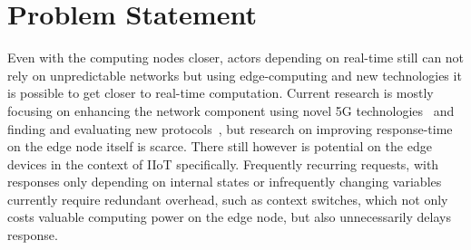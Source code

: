 \section{Problem Statement}

Even with the computing nodes closer, actors depending on real-time still can
not rely on unpredictable networks but using edge-computing and new technologies
it is possible to get closer to real-time computation. Current research is
mostly focusing on enhancing the network component using novel 5G
technologies~\cite{nunna_enabling_2015} and finding and evaluating new
protocols~\cite{suriyachai_survey_2012}, but research on improving response-time
on the edge node itself is scarce. There still however is potential on the edge
devices in the context of IIoT specifically. Frequently recurring requests, with
responses only depending on internal states or infrequently changing variables
currently require redundant overhead, such as context switches, which not only
costs valuable computing power on the edge node, but also unnecessarily delays
response.






